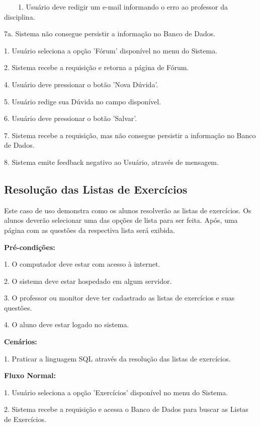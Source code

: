 \documentclass[graduacao,brazil]{ThesisPUC}
\begin{document}
\ \ \ \ 1. Usu\'{a}rio deve redigir um e-mail informando o erro ao professor da disciplina.


7a. Sistema n\~{a}o consegue persistir a informa\c{c}\~{a}o no Banco de Dados.

1. Usu\'{a}rio seleciona a op\c{c}\~{a}o 'F\'{o}rum' dispon\'{i}vel no menu do Sistema.

2. Sistema recebe a requisi\c{c}\~{a}o e retorna a p\'{a}gina de F\'{o}rum.

4. Usu\'{a}rio deve pressionar o bot\~{a}o 'Nova D\'{u}vida'.

5. Usu\'{a}rio redige sua D\'{u}vida no campo dispon\'{i}vel.

6. Usu\'{a}rio deve pressionar o bot\~{a}o 'Salvar'.

7. Sistema recebe a requisi\c{c}\~{a}o, mas n\~{a}o consegue persistir a informa\c{c}\~{a}o no Banco de Dados.

8. Sistema emite feedback negativo ao Usu\'{a}rio, atrav\'{e}s de mensagem.

\subsection{Resolu\c{c}\~{a}o das Listas de Exerc\'{i}cios}

Este caso de uso demonstra como os alunos resolver\~{a}o as listas de exerc\'{i}cios.
Os alunos dever\~{a}o selecionar uma das op\c{c}\~{o}es de lista para ser feita.
Ap\'{o}s, uma p\'{a}gina com as quest\~{o}es da respectiva lista ser\'{a} exibida.

\textbf{Pré-condições:}

1. O computador deve estar com acesso \`{a} internet.

2. O sistema deve estar hospedado em algum servidor.

3. O professor ou monitor deve ter cadastrado as listas de exerc\'{i}cios e suas quest\~{o}es.

4. O aluno deve estar logado no sistema.


\textbf{Cen\'{a}rios:}

1. Praticar a linguagem SQL atrav\'{e}s da resolu\c{c}\~{a}o das listas de exerc\'{i}cios.


\textbf{Fluxo Normal:}

1. Usu\'{a}rio seleciona a opção 'Exerc\'{i}cios' dispon\'{i}vel no menu do Sistema.

2. Sistema recebe a requisi\c{c}\~{a}o e acessa o Banco de Dados para buscar as Listas de Exerc\'{i}cios.
\end{document}
